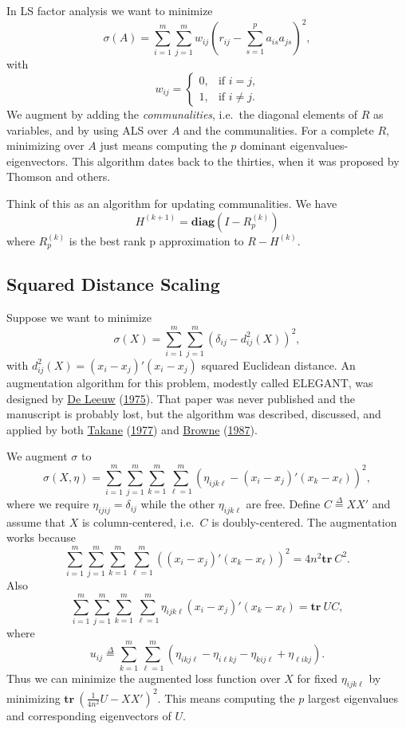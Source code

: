 \documentclass[
  12pt,
]{book}
\begin{document}
In LS factor analysis we want to minimize
\[
\sigma(A)=\sum_{i=1}^m\sum_{j=1}^m w_{ij}(r_{ij}-\sum_{s=1}^p a_{is}a_{js})^2,
\]
with
\[
w_{ij}=
\begin{cases}
0,& \text{if $i=j$,}\\
1,& \text{if $i\not=j$.}
\end{cases}
\]
We augment by adding the \emph{communalities}, i.e.~the diagonal elements
of \(R\) as variables, and by using ALS over \(A\) and the communalities. For
a complete \(R,\) minimizing over \(A\) just means computing the \(p\) dominant
eigenvalues-eigenvectors. This algorithm dates back to the thirties, when
it was proposed by Thomson and others.

Think of this as an algorithm for updating communalities. We have
\[
H^{(k+1)}=\mathbf{diag}(I-R_p^{(k)})
\]
where \(R_p^{(k)}\) is the best rank p approximation
to \(R-H^{(k)}\).

\hypertarget{squared-distance-scaling}{%
\subsection{Squared Distance Scaling}\label{squared-distance-scaling}}

Suppose we want to minimize
\[
\sigma(X)=\sum_{i=1}^m\sum_{j=1}^m(\delta_{ij}-d_{ij}^2(X))^2,
\]
with \(d_{ij}^2(X)=(x_i-x_j)'(x_i-x_j)\) squared Euclidean distance.
An augmentation algorithm for this problem, modestly called ELEGANT, was designed by \protect\hyperlink{ref-deleeuw_U_75b}{De Leeuw} (\protect\hyperlink{ref-deleeuw_U_75b}{1975}). That paper was never published and the
manuscript is probably lost, but the algorithm was
described, discussed, and applied by both \protect\hyperlink{ref-takane_77}{Takane} (\protect\hyperlink{ref-takane_77}{1977})
and \protect\hyperlink{ref-browne_87}{Browne} (\protect\hyperlink{ref-browne_87}{1987}).

We augment \(\sigma\) to
\[
\sigma(X,\eta)=
\sum_{i=1}^m\sum_{j=1}^m\sum_{k=1}^m\sum_{\ell=1}^m
(\eta_{ijk\ell}-(x_i-x_j)'(x_k-x_\ell))^2,
\]
where we require \(\eta_{ijij}=\delta_{ij}\) while the other \(\eta_{ijk\ell}\) are
free. Define \(C\mathop{=}\limits^{\Delta}XX'\) and assume that \(X\) is column-centered, i.e.~\(C\) is doubly-centered. The augmentation works because
\[
\sum_{i=1}^m\sum_{j=1}^m\sum_{k=1}^m\sum_{\ell=1}^m
\left((x_i-x_j)'(x_k-x_\ell)\right)^2=4n^2\mathbf{tr}\ C^2.
\]
Also
\[
\sum_{i=1}^m\sum_{j=1}^m\sum_{k=1}^m\sum_{\ell=1}^m\eta_{ijk\ell}(x_i-x_j)'(x_k-x_\ell)=\mathbf{tr}\ UC,
\]
where
\[
u_{ij}\mathop{=}\limits^{\Delta}\sum_{k=1}^m\sum_{\ell=1}^m
(\eta_{ikj\ell}-\eta_{i\ell kj}-\eta_{kij\ell}+\eta_{\ell i kj}).
\]
Thus we can minimize the augmented loss function over \(X\) for fixed \(\eta_{ijk\ell}\) by
minimizing \(\mathbf{tr}\ (\frac{1}{4n^2}U-XX')^2\).
This means computing the \(p\) largest eigenvalues and corresponding eigenvectors of \(U\).
\end{document}

